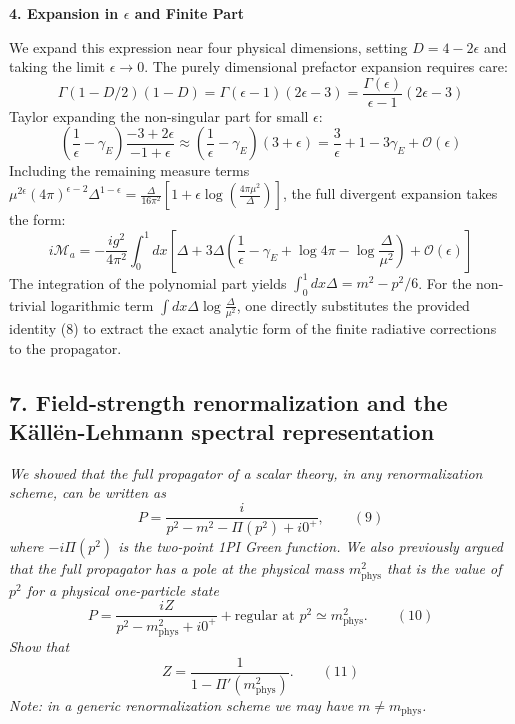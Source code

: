 \textbf{4. Expansion in $\epsilon$ and Finite Part}

We expand this expression near four physical dimensions, setting $D = 4 - 2\epsilon$ and taking the limit $\epsilon \to 0$. The purely dimensional prefactor expansion requires care:
\[
    \Gamma(1 - D/2)(1 - D) = \Gamma(\epsilon - 1)(2\epsilon - 3) = \frac{\Gamma(\epsilon)}{\epsilon - 1}(2\epsilon - 3)
\]
Taylor expanding the non-singular part for small $\epsilon$:
\[
    \left( \frac{1}{\epsilon} - \gamma_E \right) \frac{-3 + 2\epsilon}{-1 + \epsilon} \approx \left( \frac{1}{\epsilon} - \gamma_E \right) (3 + \epsilon) = \frac{3}{\epsilon} + 1 - 3\gamma_E + \mathcal{O}(\epsilon)
\]
Including the remaining measure terms $\mu^{2\epsilon} (4\pi)^{\epsilon-2} \Delta^{1-\epsilon} = \frac{\Delta}{16\pi^2} \left[1 + \epsilon \log\left(\frac{4\pi \mu^2}{\Delta}\right)\right]$, the full divergent expansion takes the form:
\[
    i\mathcal{M}_a = -\frac{ig^2}{4\pi^2} \int_0^1 dx \left[ \Delta + 3\Delta \left( \frac{1}{\epsilon} - \gamma_E + \log 4\pi - \log \frac{\Delta}{\mu^2} \right) + \mathcal{O}(\epsilon) \right] \text{}
\]
The integration of the polynomial part yields $\int_0^1 dx \Delta = m^2 - p^2/6$. For the non-trivial logarithmic term $\int dx \Delta \log \frac{\Delta}{\mu^2}$, one directly substitutes the provided identity (8) to extract the exact analytic form of the finite radiative corrections to the propagator.


\subsection*{7. Field-strength renormalization and the K\"all\"en-Lehmann spectral representation}

\begin{center}
    \textit{We showed that the full propagator of a scalar theory, in any renormalization scheme, can be written as}
    \[
        P = \frac{i}{p^2 - m^2 - \Pi(p^2) + i0^+}, \qquad (9)
    \]
    \textit{where $-i\Pi(p^2)$ is the two-point 1PI Green function. We also previously argued that the full propagator has a pole at the physical mass $m_{\text{phys}}^2$ that is the value of $p^2$ for a physical one-particle state}
    \[
        P = \frac{i Z}{p^2 - m_{\text{phys}}^2 + i0^+} + \text{regular at } p^2 \simeq m_{\text{phys}}^2. \qquad (10)
    \]
    \textit{Show that}
    \[
        Z = \frac{1}{1 - \Pi'(m_{\text{phys}}^2)}. \qquad (11)
    \]
    \textit{Note: in a generic renormalization scheme we may have $m \neq m_{\text{phys}}$.}
\end{center}

